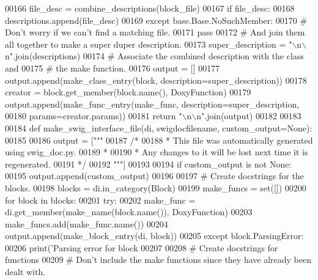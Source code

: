 \begin{DoxyCode}
{{00166         file\_desc = combine_descriptions(block\_file)
00167         \textcolor{keywordflow}{if} file\_desc:
00168             descriptions.append(file\_desc)
00169     \textcolor{keywordflow}{except} base.Base.NoSuchMember:
00170         \textcolor{comment}{# Don't worry if we can't find a matching file.}
00171         \textcolor{keywordflow}{pass}
00172     \textcolor{comment}{# And join them all together to make a super duper description.}
00173     super\_description = \textcolor{stringliteral}{"\(\backslash\)n\(\backslash\)n"}.join(descriptions)
00174     \textcolor{comment}{# Associate the combined description with the class and}
00175     \textcolor{comment}{# the make function.}
00176     output = []
00177     output.append(make_class_entry(block, description=super\_description))
00178     creator = block.get\_member(block.name(), DoxyFunction)
00179     output.append(make_func_entry(make\_func, description=super\_description,
00180                                   params=creator.params))
00181     \textcolor{keywordflow}{return} \textcolor{stringliteral}{"\(\backslash\)n\(\backslash\)n"}.join(output)
00182 
00183 
00184 \textcolor{keyword}{def }make_swig_interface_file(di, swigdocfilename, custom\_output=None):
00185 
00186     output = [\textcolor{stringliteral}{"""}
00187 \textcolor{stringliteral}{/*}
00188 \textcolor{stringliteral}{ * This file was automatically generated using swig\_doc.py.}
00189 \textcolor{stringliteral}{ *}
00190 \textcolor{stringliteral}{ * Any changes to it will be lost next time it is regenerated.}
00191 \textcolor{stringliteral}{ */}
00192 \textcolor{stringliteral}{"""}]
00193 
00194     \textcolor{keywordflow}{if} custom\_output \textcolor{keywordflow}{is} \textcolor{keywordflow}{not} \textcolor{keywordtype}{None}:
00195         output.append(custom\_output)
00196 
00197     \textcolor{comment}{# Create docstrings for the blocks.}
00198     blocks = di.in\_category(Block)
00199     make\_funcs = set([])
00200     \textcolor{keywordflow}{for} block \textcolor{keywordflow}{in} blocks:
00201         \textcolor{keywordflow}{try}:
00202             make\_func = di.get\_member(make_name(block.name()), DoxyFunction)
00203             make\_funcs.add(make\_func.name())
00204             output.append(make_block_entry(di, block))
00205         \textcolor{keywordflow}{except} block.ParsingError:
00206             print(\textcolor{stringliteral}{'Parsing error for block %
00207 
00208     \textcolor{comment}{# Create docstrings for functions}
00209     \textcolor{comment}{# Don't include the make functions since they have already been dealt with.}
}}}
\end{DoxyCode}
